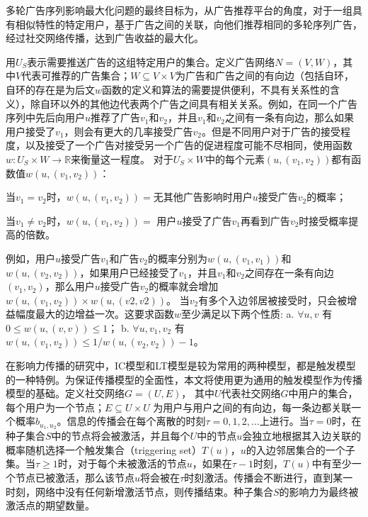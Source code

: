 多轮广告序列影响最大化问题的最终目标为，从广告推荐平台的角度，对于一组具有相似特性的特定用户，基于广告之间的关联，向他们推荐相同的多轮序列广告，经过社交网络传播，达到广告收益的最大化。

用$U_S$表示需要推送广告的这组特定用户的集合。定义广告网络$N=(V,W)$，其中$V$代表可推荐的广告集合；$W\subseteq V \times V$为广告和广告之间的有向边（包括自环，自环的存在是为后文$w$函数的定义和算法的需要提供便利，不具有关系性的含义），除自环以外的其他边代表两个广告之间具有相关关系。例如，在同一个广告序列中先后向用户$u$推荐了广告$v_1$和$v_2$，并且$v_1$和$v_2$之间有一条有向边，那么如果用户接受了$v_1$，则会有更大的几率接受广告$v_2$。但是不同用户对于广告的接受程度，以及接受了一个广告对接受另一个广告的促进程度可能不尽相同，使用函数$w:U_S \times W \to \mathbb{R}$来衡量这一程度。 对于$U_S \times W$中的每个元素$(u,(v_1,v_2))$都有函数值$w(u,(v_1,v_2))$：

当$v_1=v_2$时，$w(u,(v_1,v_2))=$无其他广告影响时用户$u$接受广告$v_2$的概率；

当$v_1\ne v_2$时，$w(u,(v_1,v_2))=$ 用户$u$接受了广告$v_1$再看到广告$v_2$时接受概率提高的倍数。


例如，用户$u$接受广告$v_1$和广告$v_2$的概率分别为$w(u,(v_1,v_1))$和$w(u,(v_2,v_2))$，如果用户已经接受了$v_1$，并且$v_1$和$v_2$之间存在一条有向边$(v_1,v_2)$，那么用户$u$接受广告$v_2$的概率就会增加$w(u,(v_1,v_2)) \times w(u,(v2,v2))$。 当$v_2$有多个入边邻居被接受时，只会被增益幅度最大的边增益一次。这要求函数$w$至少满足以下两个性质:
a. $ \forall u,v$ 有 $0\le w(u,(v,v))\le 1 $；
b. $\forall u,v_1,v_2$ 有$w(u,(v_1,v_2))\le 1/w(u,(v_2,v_2))-1$。

在影响力传播的研究中，IC模型和LT模型是较为常用的两种模型，都是触发模型的一种特例\cite{kempe2003maximizing}。为保证传播模型的全面性，本文将使用更为通用的触发模型作为传播模型的基础。定义社交网络$G=(U,E)$， 其中$U$代表社交网络$G$中用户的集合，每个用户为一个节点；$E\subseteq U\times U$ 为用户与用户之间的有向边，每一条边都关联一个概率$b_{u_1,u_2}$。信息的传播会在每个离散的时刻$\tau =0,1,2, ...$上进行。当$\tau = 0$时，在种子集合$S$中的节点将会被激活，并且每个$U$中的节点$u$会独立地根据其入边关联的概率随机选择一个触发集合（triggering set）$T(u)$，$u$的入边邻居集合的一个子集。当$\tau \ge 1$时，对于每个未被激活的节点$u$，如果在$\tau -1$时刻，$T(u)$中有至少一个节点已被激活，那么该节点$u$将会被在$\tau$时刻激活。传播会不断进行，直到某一时刻，网络中没有任何新增激活节点，则传播结束。种子集合$S$的影响力为最终被激活点的期望数量。

